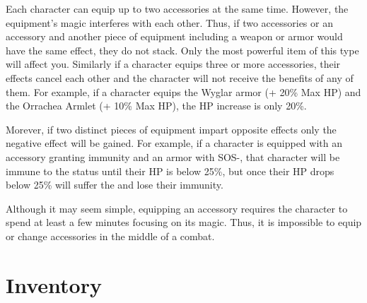 \begin{multicols}{2}
Each character can equip up to two accessories at the same time.  However, the equipment's magic interferes with each other.  Thus, if two accessories or an accessory and another piece of equipment including a weapon or armor would have the same effect, they do not stack.  Only the most powerful item of this type will affect you.  Similarly if a character equips three or more accessories, their effects cancel each other and the character will not receive the benefits of any of them.  For example, if a character equips the Wyglar armor (+ 20\% Max HP) and the Orrachea Armlet (+ 10\% Max HP), the HP increase is only 20\%.

Morever, if two distinct pieces of equipment impart opposite effects only the negative effect will be gained.  For example, if a character is equipped with an accessory granting  immunity and an armor with SOS-, that character will be immune to the  status until their HP is below 25\%, but once their HP drops below 25\% will suffer the  and lose their immunity.

Although it may seem simple, equipping an accessory requires the character to spend at least a few minutes focusing on its magic.  Thus, it is impossible to equip or change accessories in the middle of a combat.
\end{multicols}

\begin{tabacc}[label=inv-acc1]
    
\end{tabacc}
\begin{center}
\end{center}
\clearpage
\section{Inventory}\label{sec:inv-inventory}

